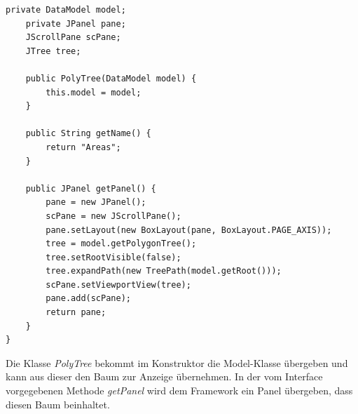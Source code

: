 \begin{description}
\begin{lstlisting}[captionpos=b, caption=Klasse PolyTree, label=polytree]
    private DataModel model;
    private JPanel pane;
    JScrollPane scPane;
    JTree tree;

    public PolyTree(DataModel model) {
        this.model = model;        
    }

    public String getName() {
        return "Areas";
    }

    public JPanel getPanel() {
        pane = new JPanel();
        scPane = new JScrollPane();
        pane.setLayout(new BoxLayout(pane, BoxLayout.PAGE_AXIS));
        tree = model.getPolygonTree();
        tree.setRootVisible(false);
        tree.expandPath(new TreePath(model.getRoot()));
        scPane.setViewportView(tree);
        pane.add(scPane);
        return pane;
    }
}
\end{lstlisting}

Die Klasse \emph{PolyTree} bekommt im Konstruktor die Model-Klasse übergeben und kann aus dieser den Baum zur Anzeige übernehmen. In der vom Interface vorgegebenen Methode \emph{getPanel} wird dem Framework ein Panel übergeben, dass diesen Baum beinhaltet.
\end{description}
